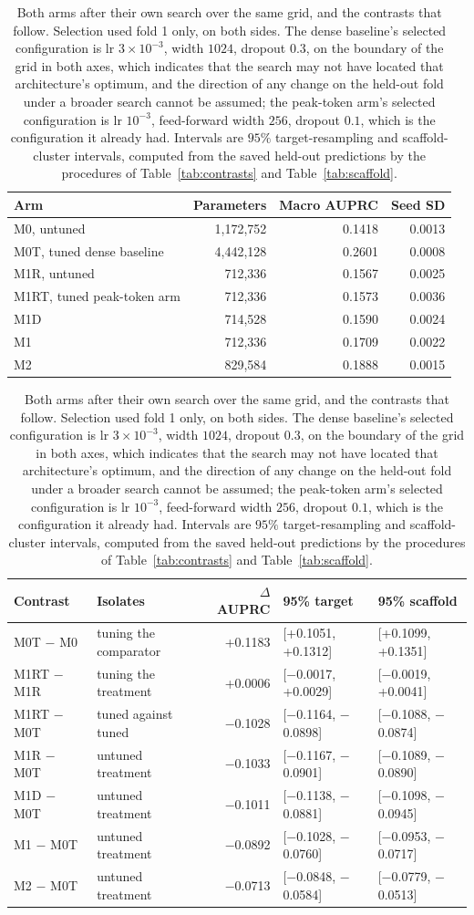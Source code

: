 \documentclass[11pt]{article}
\begin{document}
\begin{table}[ht]
\centering
\caption{Both arms after their own search over the same grid, and the contrasts
that follow. Selection used fold 1 only, on both sides. The dense baseline's
selected configuration is lr $3\times10^{-3}$, width $1024$, dropout $0.3$, on the
boundary of the grid in both axes, which indicates that the search may not have
located that architecture's optimum, and the direction of any change on the held-out
fold under a broader search cannot be assumed; the peak-token arm's selected configuration is lr
$10^{-3}$, feed-forward width $256$, dropout $0.1$, which is the configuration it
already had. Intervals are $95\%$ target-resampling and scaffold-cluster intervals,
computed from the saved held-out predictions by the procedures of
Table~\ref{tab:contrasts} and Table~\ref{tab:scaffold}.}
\label{tab:tuned}
\small\setlength{\tabcolsep}{4pt}
\begin{tabular}{lrrr}
\toprule
Arm & Parameters & Macro AUPRC & Seed SD\\
\midrule
M0, untuned & 1,172,752 & 0.1418 & 0.0013\\
M0T, tuned dense baseline & 4,442,128 & 0.2601 & 0.0008\\
M1R, untuned & 712,336 & 0.1567 & 0.0025\\
M1RT, tuned peak-token arm & 712,336 & 0.1573 & 0.0036\\
M1D & 714,528 & 0.1590 & 0.0024\\
M1 & 712,336 & 0.1709 & 0.0022\\
M2 & 829,584 & 0.1888 & 0.0015\\
\bottomrule
\end{tabular}

\vspace{8pt}
\begin{tabular}{llrll}
\toprule
Contrast & Isolates & $\Delta$ AUPRC & 95\% target & 95\% scaffold\\
\midrule
M0T $-$ M0 & tuning the comparator & +0.1183 & [+0.1051, +0.1312] & [+0.1099, +0.1351]\\
M1RT $-$ M1R & tuning the treatment & +0.0006 & [$-$0.0017, +0.0029] & [$-$0.0019, +0.0041]\\
M1RT $-$ M0T & tuned against tuned & $-$0.1028 & [$-$0.1164, $-$0.0898] & [$-$0.1088, $-$0.0874]\\
\midrule
M1R $-$ M0T & untuned treatment & $-$0.1033 & [$-$0.1167, $-$0.0901] & [$-$0.1089, $-$0.0890]\\
M1D $-$ M0T & untuned treatment & $-$0.1011 & [$-$0.1138, $-$0.0881] & [$-$0.1098, $-$0.0945]\\
M1 $-$ M0T & untuned treatment & $-$0.0892 & [$-$0.1028, $-$0.0760] & [$-$0.0953, $-$0.0717]\\
M2 $-$ M0T & untuned treatment & $-$0.0713 & [$-$0.0848, $-$0.0584] & [$-$0.0779, $-$0.0513]\\
\bottomrule
\end{tabular}
\end{table}
\end{document}
